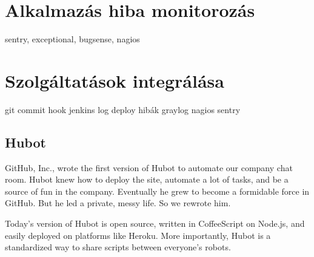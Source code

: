 \section{Alkalmazás hiba monitorozás}
sentry, exceptional, bugsense, nagios


\section{Szolgáltatások integrálása}
git commit hook
jenkins log
deploy
hibák
graylog
nagios
sentry
\subsection{Hubot}

GitHub, Inc., wrote the first version of Hubot to automate our company chat room. Hubot knew how to deploy the site, automate a lot of tasks, and be a source of fun in the company. Eventually he grew to become a formidable force in GitHub. But he led a private, messy life. So we rewrote him.

Today's version of Hubot is open source, written in CoffeeScript on Node.js, and easily deployed on platforms like Heroku. More importantly, Hubot is a standardized way to share scripts between everyone's robots.